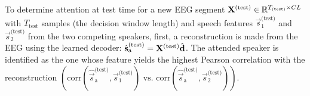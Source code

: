 \documentclass[fleqn,10pt]{wlscirep}
\begin{document}
	
	
	To determine attention at test time for a new EEG segment $\mat{X}^{(\text{test})} \in \R^{T_\text{(test)} \times CL}$ with $T_{\text{test}}$ samples (the decision window length) and speech features $\vec{s}_1^{\text{(test)}}$ and $\vec{s}_2^{\text{(test)}}$ from the two competing speakers, first, a reconstruction is made from the EEG using the learned decoder: $\hat{\vec{s}}^{\text{(test)}}_{\text{a}} = \mat{X}^{\text{(test)}}\hat{\vec{d}}$. The attended speaker is identified as the one whose feature yields the highest Pearson correlation with the reconstruction $\left(\text{corr}\!\left(\hat{\vec{s}}^{\text{(test)}}_{\text{a}},\vec{s}_1^{\text{(test)}}\right) \text{ vs. } \text{corr}\!\left(\hat{\vec{s}}^{\text{(test)}}_{\text{a}},\vec{s}_2^{\text{(test)}}\right)\right)$.
	
\end{document}
